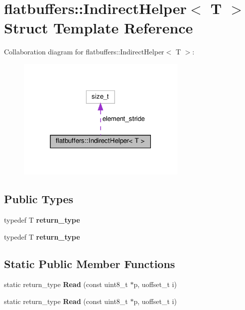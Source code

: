\hypertarget{structflatbuffers_1_1IndirectHelper}{}\section{flatbuffers\+:\+:Indirect\+Helper$<$ T $>$ Struct Template Reference}
\label{structflatbuffers_1_1IndirectHelper}


Collaboration diagram for flatbuffers\+:\+:Indirect\+Helper$<$ T $>$\+:
\nopagebreak
\begin{figure}[H]
\begin{center}
\leavevmode
\includegraphics[width=231pt]{structflatbuffers_1_1IndirectHelper__coll__graph}
\end{center}
\end{figure}
\subsection*{Public Types}
\begin{DoxyCompactItemize}
\item 
\mbox{\label{structflatbuffers_1_1IndirectHelper_af257f8e8aacb6ff0d5dcfc8dd053f3c4}} 
typedef T {\bfseries return\+\_\+type}
\item 
\mbox{\label{structflatbuffers_1_1IndirectHelper_af257f8e8aacb6ff0d5dcfc8dd053f3c4}} 
typedef T {\bfseries return\+\_\+type}
\end{DoxyCompactItemize}
\subsection*{Static Public Member Functions}
\begin{DoxyCompactItemize}
\item 
\mbox{\label{structflatbuffers_1_1IndirectHelper_af64c70657c1e44cb522c2fd02ec26f7d}} 
static return\+\_\+type {\bfseries Read} (const uint8\+\_\+t $\ast$p, uoffset\+\_\+t i)
\item 
\mbox{\label{structflatbuffers_1_1IndirectHelper_af64c70657c1e44cb522c2fd02ec26f7d}} 
static return\+\_\+type {\bfseries Read} (const uint8\+\_\+t $\ast$p, uoffset\+\_\+t i)
\end{DoxyCompactItemize}
